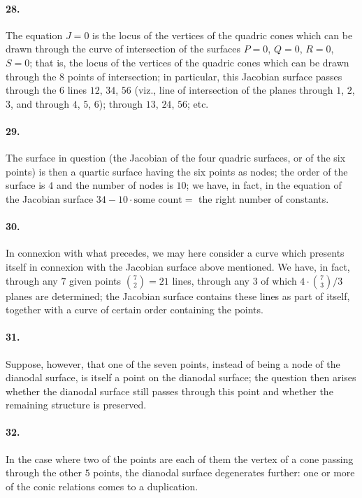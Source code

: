 \documentclass[11pt,a4paper]{article}
\begin{document}
\paragraph{28.}
The equation $J = 0$ is the locus of the vertices of the quadric cones which can be drawn
through the curve of intersection of the surfaces $P = 0$, $Q = 0$, $R = 0$, $S = 0$;
that is, the locus of the vertices of the quadric cones which can be drawn through the
$8$ points of intersection; in particular, this Jacobian surface passes through the
$6$ lines $12$, $34$, $56$ (viz., line of intersection of the planes through $1$, $2$, $3$,
and through $4$, $5$, $6$); through $13$, $24$, $56$; etc.

\paragraph{29.}
The surface in question (the Jacobian of the four quadric surfaces, or of the six points)
is then a quartic surface having the six points as nodes; the order of the surface is
$4$ and the number of nodes is $10$; we have, in fact, in the equation of the Jacobian
surface $34 - 10 \cdot \text{some count} = $ the right number of constants.

\paragraph{30.}
In connexion with what precedes, we may here consider a curve which presents itself in
connexion with the Jacobian surface above mentioned. We have, in fact, through any $7$
given points $\binom{7}{2} = 21$ lines, through any $3$ of which $4 \cdot \binom{7}{3} / 3$
planes are determined; the Jacobian surface contains these lines as part of itself,
together with a curve of certain order containing the points.

\paragraph{31.}
Suppose, however, that one of the seven points, instead of being a node of the dianodal
surface, is itself a point on the dianodal surface; the question then arises whether
the dianodal surface still passes through this point and whether the remaining structure
is preserved.

\paragraph{32.}
In the case where two of the points are each of them the vertex of a cone passing through
the other $5$ points, the dianodal surface degenerates further: one or more of the conic
relations comes to a duplication.
\end{document}
